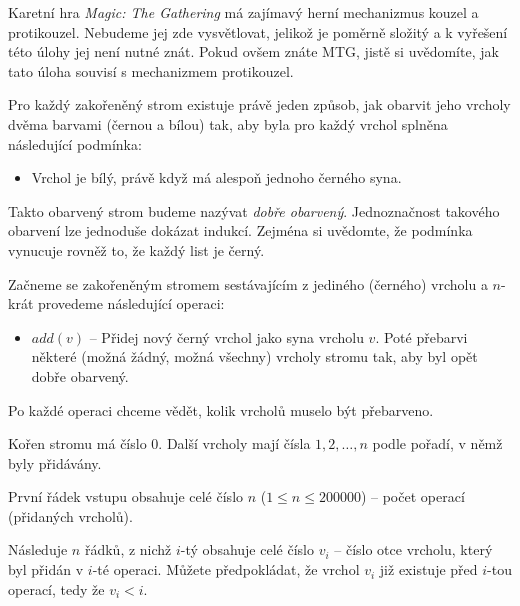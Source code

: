 
\usepackage[czech]{babel}





Karetní hra \emph{Magic: The Gathering} má zajímavý herní mechanizmus
kouzel a protikouzel. Nebudeme jej zde vysvětlovat, jelikož je poměrně
složitý a k vyřešení této úlohy jej není nutné znát. Pokud ovšem znáte MTG,
jistě si uvědomíte, jak tato úloha souvisí s mechanizmem protikouzel.


Pro každý zakořeněný strom existuje právě jeden způsob, jak obarvit jeho vrcholy
dvěma barvami (černou a bílou) tak, aby byla pro každý vrchol splněna následující podmínka:
\begin{itemize}
\item Vrchol je bílý, právě když má alespoň jednoho černého syna.
\end{itemize}

Takto obarvený strom budeme nazývat \emph{dobře obarvený}.
Jednoznačnost takového obarvení lze jednoduše dokázat indukcí.
Zejména si uvědomte, že podmínka vynucuje rovněž to, že každý list je černý.


Začneme se zakořeněným stromem sestávajícím z jediného (černého) vrcholu
a $n$-krát provedeme následující operaci:

\begin{itemize}
\item $add(v)$ -- Přidej nový černý vrchol jako syna vrcholu $v$. Poté přebarvi některé
                  (možná žádný, možná všechny) vrcholy stromu tak, aby byl opět dobře obarvený.
\end{itemize}

Po každé operaci chceme vědět, kolik vrcholů muselo být přebarveno.


Kořen stromu má číslo $0$. Další vrcholy mají čísla $1, 2, \dots, n$
podle pořadí, v němž byly přidávány.

První řádek vstupu obsahuje celé číslo $n$ ($1 \leq n \leq 200000$) -- 
počet operací (přidaných vrcholů).

Následuje $n$ řádků, z nichž $i$-tý obsahuje celé číslo $v_i$ -- číslo otce vrcholu,
který byl přidán v $i$-té operaci. Můžete předpokládat, že vrchol $v_i$ již existuje před $i$-tou operací,
tedy že $v_i < i$.

